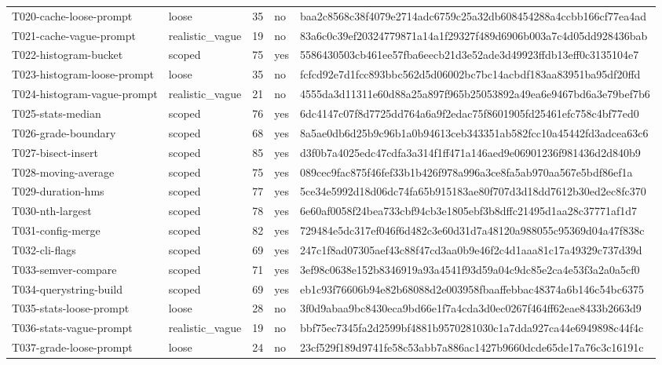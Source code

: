 \begin{tabular}{lllll}
T020-cache-loose-prompt & loose & 35 & no & baa2c8568c38f4079e2714adc6759c25a32db608454288a4ccbb166cf77ea4ad \\
T021-cache-vague-prompt & realistic\_vague & 19 & no & 83a6c0c39ef20324779871a14a1f29327f489d6906b003a7c4d05dd928436bab \\
T022-histogram-bucket & scoped & 75 & yes & 5586430503cb461ee57fba6eecb21d3e52ade3d49923ffdb13eff0c3135104e7 \\
T023-histogram-loose-prompt & loose & 35 & no & fcfcd92e7d1fcc893bbc562d5d06002bc7bc14acbdf183aa83951ba95df20ffd \\
T024-histogram-vague-prompt & realistic\_vague & 21 & no & 4555da3d11311e60d88a25a897f965b25053892a49ea6e9467bd6a3e79bef7b6 \\
T025-stats-median & scoped & 76 & yes & 6dc4147c07f8d7725dd764a6a9f2edac75f8601905fd25461efc758c4bf77ed0 \\
T026-grade-boundary & scoped & 68 & yes & 8a5ae0db6d25b9c96b1a0b94613ceb343351ab582fcc10a45442fd3adcea63c6 \\
T027-bisect-insert & scoped & 85 & yes & d3f0b7a4025edc47cdfa3a314f1ff471a146aed9e06901236f981436d2d840b9 \\
T028-moving-average & scoped & 75 & yes & 089cec9fac875f46fef33b1b426f978a996a3ce8fa5ab970aa567e5bdf86ef1a \\
T029-duration-hms & scoped & 77 & yes & 5ce34e5992d18d06dc74fa65b915183ae80f707d3d18dd7612b30ed2ec8fc370 \\
T030-nth-largest & scoped & 78 & yes & 6e60af0058f24bea733cbf94cb3e1805ebf3b8dffc21495d1aa28c37771af1d7 \\
T031-config-merge & scoped & 82 & yes & 729484e5dc317ef046f6d482c3e60d31d7a48120a988055c95369d04a47f838c \\
T032-cli-flags & scoped & 69 & yes & 247c1f8ad07305aef43c88f47cd3aa0b9e46f2c4d1aaa81c17a49329c737d39d \\
T033-semver-compare & scoped & 71 & yes & 3ef98c0638e152b8346919a93a4541f93d59a04c9dc85e2ca4e53f3a2a0a5cf0 \\
T034-querystring-build & scoped & 69 & yes & eb1c93f76606b94e82b68088d2e003958fbaaffebbac48374a6b146c54bc6375 \\
T035-stats-loose-prompt & loose & 28 & no & 3f0d9abaa9bc8430eca9bd66e1f7a4cda3d0ec0267f464ff62eae8433b2663d9 \\
T036-stats-vague-prompt & realistic\_vague & 19 & no & bbf75ec7345fa2d2599bf4881b9570281030c1a7dda927ca44e6949898c44f4c \\
T037-grade-loose-prompt & loose & 24 & no & 23cf529f189d9741fe58c53abb7a886ac1427b9660dcde65de17a76c3c16191c \\

\end{tabular}
